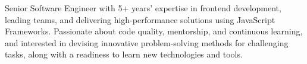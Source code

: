 

\begin{cvparagraph}

Senior Software Engineer with 5+ years' expertise in frontend development, leading teams, and delivering high-performance solutions using JavaScript Frameworks. Passionate about code quality, mentorship, and continuous learning, and interested in devising innovative problem-solving methods for challenging tasks, along with a readiness to learn new technologies and tools.

\end{cvparagraph}
